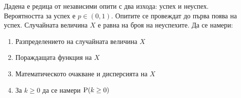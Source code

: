 \documentclass[numbers=endperiod, DIV=15, bibliography=totocnumbered]{scrartcl}
\begin{document}
\begin{exercise}\label{ex:se-summer2014}
  Дадена е редица от независими опити с два изхода: успех и неуспех. Вероятността за успех е $p \in (0, 1)$. Опитите се провеждат до първа поява на успех. Случайната величина $X$ е равна на броя на неуспехите. Да се намери:
  \begin{enumerate}[label=\alph*)]
    \item Разпределението на случайната величина $X$
    \item Пораждащата функция на $X$
    \item Математическото очакване и дисперсията на $X$
    \item За $k \geq 0$ да се намери $\operatorname{P}(k \geq 0)$
  \end{enumerate}
\end{exercise}
\end{document}
